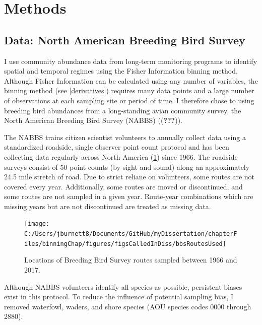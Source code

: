 \documentclass[12pt,twoside]{reedthesis}
\begin{document}
\hypertarget{methods-2}{%
\section{Methods}\label{methods-2}}

\hypertarget{data-north-american-breeding-bird-survey}{%
\subsection{Data: North American Breeding Bird Survey}\label{data-north-american-breeding-bird-survey}}

I use community abundance data from long-term monitoring programs to identify spatial and temporal regimes using the Fisher Information binning method. Although Fisher Information can be calculated using any number of variables, the binning method (see \ref{derivatives}) requires many data points and a large number of observations at each sampling site or period of time. I therefore chose to using breeding bird abundances from a long-standing avian community survey, the North American Breeding Bird Survey (NABBS) (({\textbf{???}})).

The NABBS trains citizen scientist volunteers to annually collect data using a standardized roadside, single observer point count protocol and has been collecting data regularly across North America (\ref{fig:bbsPoints}) since 1966. The roadside surveys consist of 50 point counts (by sight and sound) along an approximately 24.5 mile stretch of road. Due to strict reliane on volunteers, some routes are not covered every year. Additionally, some routes are moved or discontinued, and some routes are not sampled in a given year. Route-year combinations which are missing years but are not discontinued are treated as missing data.
\begin{figure}

{\centering \texttt{[image: C:/Users/jburnett8/Documents/GitHub/myDissertation/chapterFiles/binningChap/figures/figsCalledInDiss/bbsRoutesUsed]} 

}

\caption{Locations of Breeding Bird Survey routes sampled between 1966 and 2017.}\label{fig:bbsPoints}
\end{figure}
Although NABBS volunteers identify all species as possible, persistent biases exist in this protocol. To reduce the influence of potential sampling bias, I removed waterfowl, waders, and shore species (AOU species codes 0000 through 2880).
\end{document}
